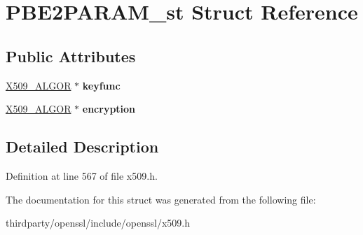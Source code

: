 \hypertarget{struct_p_b_e2_p_a_r_a_m__st}{}\section{P\+B\+E2\+P\+A\+R\+A\+M\+\_\+st Struct Reference}
\label{struct_p_b_e2_p_a_r_a_m__st}
\subsection*{Public Attributes}
\begin{DoxyCompactItemize}
\item 
\mbox{\label{struct_p_b_e2_p_a_r_a_m__st_a25475b98a4fde64162ffd0b124be4a62}} 
\hyperlink{struct_x509__algor__st}{X509\+\_\+\+A\+L\+G\+OR} $\ast$ {\bfseries keyfunc}
\item 
\mbox{\label{struct_p_b_e2_p_a_r_a_m__st_a72b700e16f2dc2f87e2caa6cdce6a1c8}} 
\hyperlink{struct_x509__algor__st}{X509\+\_\+\+A\+L\+G\+OR} $\ast$ {\bfseries encryption}
\end{DoxyCompactItemize}


\subsection{Detailed Description}


Definition at line 567 of file x509.\+h.



The documentation for this struct was generated from the following file\+:\begin{DoxyCompactItemize}
\item 
thirdparty/openssl/include/openssl/x509.\+h\end{DoxyCompactItemize}
